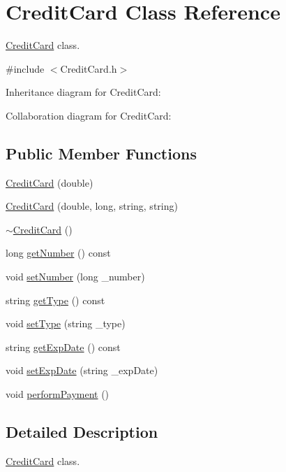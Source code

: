 \hypertarget{classCreditCard}{}\section{Credit\+Card Class Reference}
\label{classCreditCard}


\hyperlink{classCreditCard}{Credit\+Card} class.  




{\ttfamily \#include $<$Credit\+Card.\+h$>$}



Inheritance diagram for Credit\+Card\+:


Collaboration diagram for Credit\+Card\+:
\subsection*{Public Member Functions}
\begin{DoxyCompactItemize}
\item 
\hyperlink{classCreditCard_ac44cde50c1d912b02bf147d22da1b117}{Credit\+Card} (double)
\item 
\hyperlink{classCreditCard_a6d9059ca027aa6ef903158a2efddc35d}{Credit\+Card} (double, long, string, string)
\item 
\hyperlink{classCreditCard_ad52ec9053d232978878bf630e464b67b}{$\sim$\+Credit\+Card} ()
\item 
long \hyperlink{classCreditCard_aa50bbb46d6783a16bf6cd2e840be3d64}{get\+Number} () const 
\item 
void \hyperlink{classCreditCard_aa57cb564e21aef7a8b4f9213f3565992}{set\+Number} (long \+\_\+number)
\item 
string \hyperlink{classCreditCard_a00cf997bfe2dda492ef4562c3b9d0b71}{get\+Type} () const 
\item 
void \hyperlink{classCreditCard_a19cc344b1375f7698267999e424eabb3}{set\+Type} (string \+\_\+type)
\item 
string \hyperlink{classCreditCard_aa2590ced69410bb54b9db593fef414f2}{get\+Exp\+Date} () const 
\item 
void \hyperlink{classCreditCard_a44c7385c4ed7dbb6f19565c01d84cdd4}{set\+Exp\+Date} (string \+\_\+exp\+Date)
\item 
void \hyperlink{classCreditCard_ad41ae39d73adea22555db100311a5101}{perform\+Payment} ()
\end{DoxyCompactItemize}


\subsection{Detailed Description}
\hyperlink{classCreditCard}{Credit\+Card} class. 


